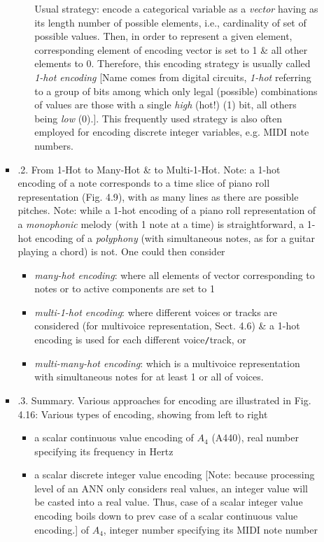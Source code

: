 \documentclass{article}
\begin{document}
\begin{itemize}
\begin{itemize}
\begin{itemize}
\begin{itemize}
				Usual strategy: encode a categorical variable as a {\it vector} having as its length number of possible elements, i.e., cardinality of set of possible values. Then, in order to represent a given element, corresponding element of encoding vector is set to 1 \& all other elements to 0. Therefore, this encoding strategy is usually called {\it1-hot encoding} [Name comes from digital circuits, {\it1-hot} referring to a group of bits among which only legal (possible) combinations of values are those with a single {\it high} (hot!) (1) bit, all others being {\it low} (0).]. This frequently used strategy is also often employed for encoding discrete integer variables, e.g. MIDI note numbers.
			\end{itemize}
			\item {.2. From 1-Hot to Many-Hot \& to Multi-1-Hot.} Note: a 1-hot encoding of a note corresponds to a time slice of piano roll representation ({\sf Fig. 4.9}), with as many lines as there are possible pitches. Note: while a 1-hot encoding of a piano roll representation of a {\it monophonic} melody (with 1 note at a time) is straightforward, a 1-hot encoding of a {\it polyphony} (with simultaneous notes, as for a guitar playing a chord) is not. One could then consider
			\begin{itemize}
				\item {\it many-hot encoding}: where all elements of vector corresponding to notes or to active components are set to 1
				\item {\it multi-1-hot encoding}: where different voices or tracks are considered (for multivoice representation, Sect. 4.6) \& a 1-hot encoding is used for each different voice{\tt/}track, or
				\item {\it multi-many-hot encoding}: which is a multivoice representation with simultaneous notes for at least 1 or all of voices.
			\end{itemize}
			\item {.3. Summary.} Various approaches for encoding are illustrated in {\sf Fig. 4.16: Various types of encoding}, showing from left to right
			\begin{itemize}
				\item a scalar continuous value encoding of $A_4$ (A440), real number specifying its frequency in Hertz
				\item a scalar discrete integer value encoding [Note: because processing level of an ANN only considers real values, an integer value will be casted into a real value. Thus, case of a scalar integer value encoding boils down to prev case of a scalar continuous value encoding.] of $A_4$, integer number specifying its MIDI note number

\end{itemize}
\end{itemize}
\end{itemize}
\end{itemize}
\end{document}
